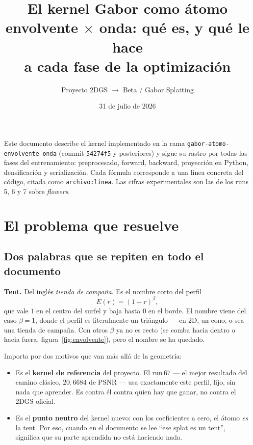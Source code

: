 \documentclass[12pt]{extarticle}
\title{\bfseries El kernel Gabor como átomo\\[0.25em]
\large envolvente $\times$ onda: qué es, y qué le hace\\ a cada fase de la optimización}
\author{\normalsize Proyecto 2DGS $\rightarrow$ Beta / Gabor Splatting}
\date{\normalsize 31 de julio de 2026}
\newcommand{\code}[1]{\texttt{#1}}
\begin{document}
\maketitle
\thispagestyle{fancy}

{\small
Este documento describe el kernel implementado en la rama
\code{gabor-atomo-envolvente-onda} (commit \code{54274f5} y posteriores) y sigue
su rastro por todas las fases del entrenamiento: preprocesado, forward,
backward, proyección en Python, densificación y serialización. Cada fórmula
corresponde a una línea concreta del código, citada como
\code{archivo:línea}. Las cifras experimentales son las de los runs
5, 6 y 7 sobre \emph{flowers}.
}

\tableofcontents
\clearpage

\section{El problema que resuelve}

\subsection{Dos palabras que se repiten en todo el documento}

\textbf{Tent.} Del inglés \emph{tienda de campaña}. Es el nombre corto del
perfil
\[
E(r)=(1-r)^{\beta},
\]
que vale $1$ en el centro del surfel y baja hasta $0$ en el borde. El nombre
viene del caso $\beta=1$, donde el perfil es literalmente un triángulo --- en
2D, un cono, o sea una tienda de campaña. Con otros $\beta$ ya no es recto
(se comba hacia dentro o hacia fuera, figura~\ref{fig:envolvente}), pero el
nombre se ha quedado.

Importa por dos motivos que van más allá de la geometría:

\begin{itemize}
\item Es el \textbf{kernel de referencia} del proyecto. El run\,67 --- el mejor
      resultado del camino clásico, $20{,}6684$ de PSNR --- usa exactamente
      este perfil, fijo, sin nada que aprender. Es contra él contra quien hay
      que ganar, no contra el 2DGS oficial.
\item Es el \textbf{punto neutro} del kernel nuevo: con los coeficientes a
      cero, el átomo \emph{es} la tent. Por eso, cuando en el documento se lee
      ``ese splat es un tent'', significa que su parte aprendida no está
      haciendo nada.
\end{itemize}
\end{document}
